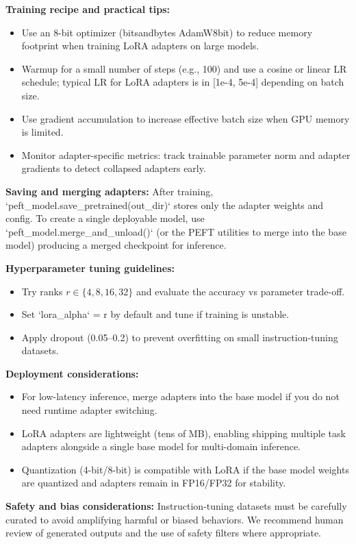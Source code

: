 \documentclass[conference]{IEEEtran}
\begin{document}
\textbf{Training recipe and practical tips:}
\begin{itemize}
  \item Use an 8-bit optimizer (bitsandbytes AdamW8bit) to reduce memory footprint when training LoRA adapters on large models.
  \item Warmup for a small number of steps (e.g., 100) and use a cosine or linear LR schedule; typical LR for LoRA adapters is in [1e-4, 5e-4] depending on batch size.
  \item Use gradient accumulation to increase effective batch size when GPU memory is limited.
  \item Monitor adapter-specific metrics: track trainable parameter norm and adapter gradients to detect collapsed adapters early.
\end{itemize}

\textbf{Saving and merging adapters:} After training, `peft_model.save_pretrained(out_dir)` stores only the adapter weights and config. To create a single deployable model, use `peft_model.merge_and_unload()` (or the PEFT utilities to merge into the base model) producing a merged checkpoint for inference.

\textbf{Hyperparameter tuning guidelines:}
\begin{itemize}
  \item Try ranks $r \in \{4,8,16,32\}$ and evaluate the accuracy vs parameter trade-off.
  \item Set `lora_alpha` = r by default and tune if training is unstable.
  \item Apply dropout (0.05--0.2) to prevent overfitting on small instruction-tuning datasets.
\end{itemize}

\textbf{Deployment considerations:}
\begin{itemize}
  \item For low-latency inference, merge adapters into the base model if you do not need runtime adapter switching.
  \item LoRA adapters are lightweight (tens of MB), enabling shipping multiple task adapters alongside a single base model for multi-domain inference.
  \item Quantization (4-bit/8-bit) is compatible with LoRA if the base model weights are quantized and adapters remain in FP16/FP32 for stability.
\end{itemize}

\textbf{Safety and bias considerations:} Instruction-tuning datasets must be carefully curated to avoid amplifying harmful or biased behaviors. We recommend human review of generated outputs and the use of safety filters where appropriate.
\end{document}
